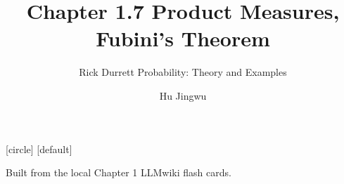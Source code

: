 [circle]
[default]

\usepackage{amsmath,amssymb,mathtools}

\newcommand{\R}{\mathbb{R}}
\newcommand{\N}{\mathbb{N}}
\newcommand{\Prob}{\mathbb{P}}
\newcommand{\E}{\mathbb{E}}
\newcommand{\A}{\mathcal{A}}
\newcommand{\B}{\mathcal{B}}
\newcommand{\F}{\mathcal{F}}
\newcommand{\one}{\mathbf{1}}
\newcommand{\Leb}{\lambda}
\newcommand{\vikiname}[1]{\par\smallskip{\scriptsize\color{blue!60!black}\textbf{LLMwiki:} \texttt{\detokenize{#1}}}}
\newcommand{\blankproof}{%
  \vspace{2mm}
  {\color{gray!55}\rule{\linewidth}{0.4pt}}\par\vspace{5mm}
  {\color{gray!55}\rule{\linewidth}{0.4pt}}\par\vspace{5mm}
  {\color{gray!55}\rule{\linewidth}{0.4pt}}\par\vspace{5mm}
  {\color{gray!55}\rule{\linewidth}{0.4pt}}\par
}
\newcommand{\longblankproof}{%
  \vspace{1mm}
  {\color{gray!55}\rule{\linewidth}{0.4pt}}\par\vspace{4mm}
  {\color{gray!55}\rule{\linewidth}{0.4pt}}\par\vspace{4mm}
  {\color{gray!55}\rule{\linewidth}{0.4pt}}\par\vspace{4mm}
  {\color{gray!55}\rule{\linewidth}{0.4pt}}\par\vspace{4mm}
  {\color{gray!55}\rule{\linewidth}{0.4pt}}\par\vspace{4mm}
  {\color{gray!55}\rule{\linewidth}{0.4pt}}\par
}
\newcommand{\proofblock}[1]{\ifteacher #1 \else \blankproof \fi}
\newcommand{\longproofblock}[1]{\ifteacher #1 \else \longblankproof \fi}

\title[Chapter 1.7]{Chapter 1.7 Product Measures, Fubini's Theorem}
\subtitle{Rick Durrett Probability: Theory and Examples}
\author{Hu Jingwu}
\date{}



\begin{frame}
  \titlepage
  \vspace{-5mm}
  \begin{center}
    \small Built from the local Chapter 1 LLMwiki flash cards.
  \end{center}
\end{frame}

